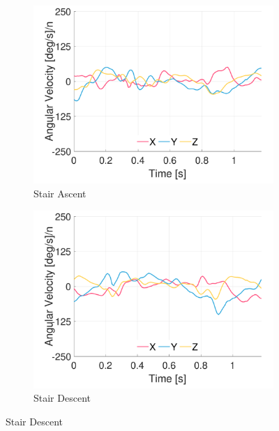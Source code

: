 \begin{figure}[p]
    \begin{subfigure}[b]{0.49\textwidth}
         \centering
         \includegraphics[width=\textwidth]{content/3-Methods/example-data/ch3_example_data_subject_01_l_hip_gyro_activity_stair_down.pdf}
         \caption{Stair Ascent}
    \end{subfigure}
    \begin{subfigure}[b]{0.49\textwidth}
         \centering
         \includegraphics[width=\textwidth]{content/3-Methods/example-data/ch3_example_data_subject_01_l_hip_gyro_activity_stair_up.pdf}
         \caption{Stair Descent}
    \end{subfigure}
    

\end{figure}
